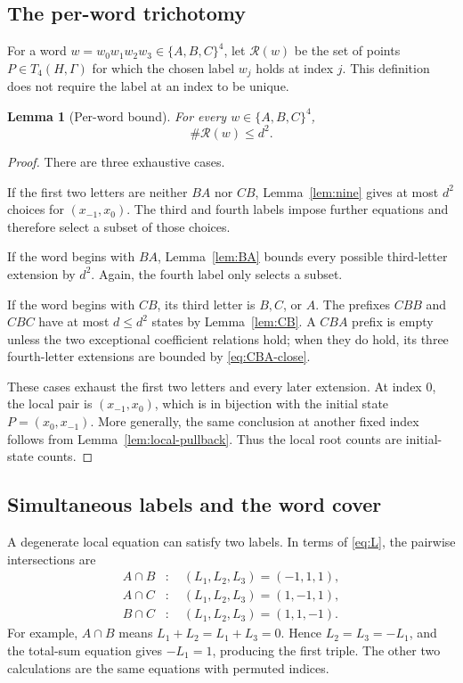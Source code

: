 \documentclass[11pt]{article}
\newtheorem{lemma}[theorem]{Lemma}
\theoremstyle{definition}
\theoremstyle{remark}
\begin{document}
\subsection{The per-word trichotomy}

For a word \(w=w_0w_1w_2w_3\in\{A,B,C\}^4\), let
\(\mathcal R(w)\) be the set of points \(P\in T_4(H,\Gamma)\) for which the
chosen label \(w_j\) holds at index \(j\).  This definition does not require
the label at an index to be unique.

\begin{lemma}[Per-word bound]\label{lem:per-word}
For every \(w\in\{A,B,C\}^4\),
\[
 \#\mathcal R(w)\le d^2.
\]
\end{lemma}

\begin{proof}
There are three exhaustive cases.

If the first two letters are neither \(BA\) nor \(CB\),
Lemma~\ref{lem:nine} gives at most \(d^2\) choices for
\((x_{-1},x_0)\).  The third and fourth labels impose further equations and
therefore select a subset of those choices.

If the word begins with \(BA\), Lemma~\ref{lem:BA} bounds every possible
third-letter extension by \(d^2\).  Again, the fourth label only selects a
subset.

If the word begins with \(CB\), its third letter is \(B,C\), or \(A\).
The prefixes \(CBB\) and \(CBC\) have at most \(d\le d^2\) states by
Lemma~\ref{lem:CB}.  A \(CBA\) prefix is empty unless the two exceptional
coefficient relations hold; when they do hold, its three fourth-letter
extensions are bounded by \eqref{eq:CBA-close}.

These cases exhaust the first two letters and every later extension.  At
index \(0\), the local pair is \((x_{-1},x_0)\), which is in bijection with
the initial state \(P=(x_0,x_{-1})\).  More generally, the same conclusion at
another fixed index follows from Lemma~\ref{lem:local-pullback}.  Thus the
local root counts are initial-state counts.
\end{proof}

\subsection{Simultaneous labels and the word cover}\label{subsec:simultaneous}

A degenerate local equation can satisfy two labels.  In terms of
\eqref{eq:L}, the pairwise intersections are
\begin{equation}\label{eq:overlaps}
\begin{aligned}
 A\cap B&:\quad (L_1,L_2,L_3)=(-1,1,1),\\
 A\cap C&:\quad (L_1,L_2,L_3)=(1,-1,1),\\
 B\cap C&:\quad (L_1,L_2,L_3)=(1,1,-1).
\end{aligned}
\end{equation}
For example, \(A\cap B\) means
\(L_1+L_2=L_1+L_3=0\).  Hence \(L_2=L_3=-L_1\), and the total-sum equation
gives \(-L_1=1\), producing the first triple.  The other two calculations
are the same equations with permuted indices.
\end{document}

